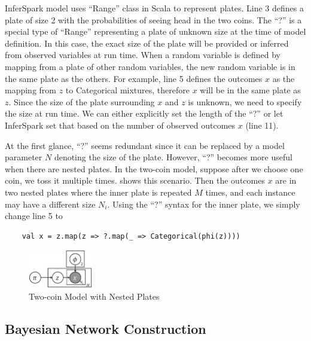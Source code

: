 InferSpark model uses ``Range'' class in Scala to represent plates. Line 3
defines a plate of size 2 with the probabilities of seeing head in the 
two coins. The ``?'' is a special type of ``Range'' representing 
a plate of unknown size at the time of model definition. 
In this case, the exact size of the plate will be provided or inferred
from observed variables at run time.  When a random variable is
defined by mapping from a plate of other random variables, 
the new random variable is in the same plate as the others.  
For example, line 5 defines the outcomes $x$ as the mapping from $z$ 
to Categorical mixtures, therefore $x$ will be in the same plate as
$z$. Since the size of the plate surrounding $x$ and $z$ is unknown, we need
to specify the size at run time.  We can either explicitly set the length of
the ``?'' or let InferSpark set that based on the number of observed outcomes
$x$ (line 11).

At the first glance, ``?'' seems redundant since it can be replaced by a
model parameter $N$ denoting the size of the plate.  However, ``?'' becomes
more useful when there are nested plates. In the two-coin model, suppose
after we choose one coin, we toss it multiple times. 
 shows this scenario.
Then the outcomes $x$ are in two nested plates where the inner plate is
repeated $M$ times, and each instance may have
a different size $N_i$. Using the ``?'' syntax
for the inner plate, we simply change line 5 to

{\small\begin{verbatim}
	val x = z.map(z => ?.map(_ => Categorical(phi(z))))	
\end{verbatim}
}

\begin{figure}[th]
	\centering
	\includegraphics[width=0.25\textwidth]{figs/two_coins_nestedplates}
	\caption{Two-coin Model with Nested Plates}
	\label{fig:two_coins_nestedplates}
\end{figure}

\subsection{Bayesian Network Construction}

